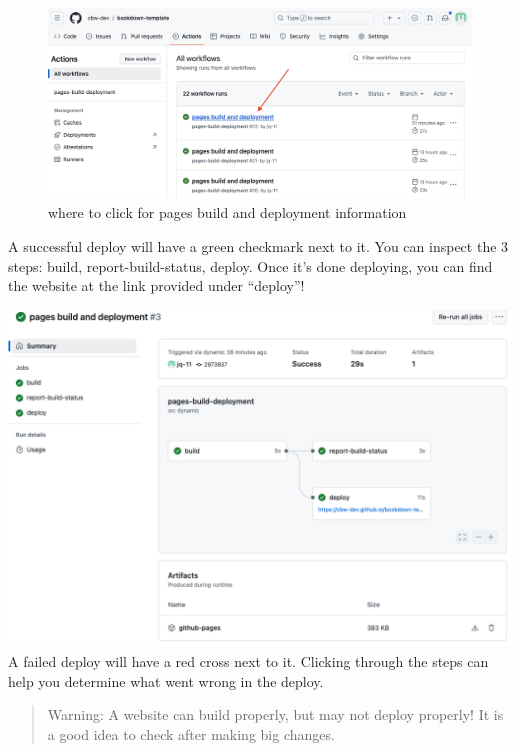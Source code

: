 \documentclass[
]{book}
\theoremstyle{definition}
\theoremstyle{definition}
\theoremstyle{definition}
\theoremstyle{definition}
\theoremstyle{remark}
\begin{document}
\begin{figure}
\centering
\includegraphics{img/git-instruct/pages-build-and-deployment.png}
\caption{where to click for pages build and deployment information}
\end{figure}

A successful deploy will have a green checkmark next to it. You can inspect the 3 steps: build, report-build-status, deploy. Once it's done deploying, you can find the website at the link provided under ``deploy''!

\includegraphics{img/git-instruct/successful-deploy.png}\\

A failed deploy will have a red cross next to it. Clicking through the steps can help you determine what went wrong in the deploy.

\begin{quote}
Warning: A website can build properly, but may not deploy properly! It is a good idea to check after making big changes.
\end{quote}
\end{document}
